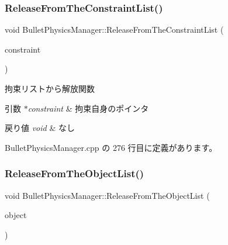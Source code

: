 \mbox{\label{class_bullet_physics_manager_a1984c226e0d77dfdf677070d659664de}} 
\subsubsection{\texorpdfstring{Release\+From\+The\+Constraint\+List()}{ReleaseFromTheConstraintList()}}
{\footnotesize\ttfamily void Bullet\+Physics\+Manager\+::\+Release\+From\+The\+Constraint\+List (\begin{DoxyParamCaption}\item[{\mbox{\hyperlink{class_bullet_physics_constraint}{Bullet\+Physics\+Constraint}} $\ast$}]{constraint }\end{DoxyParamCaption})}



拘束リストから解放関数 


\begin{DoxyParams}{引数}
{\em $\ast$constraint} & 拘束自身のポインタ \\
\hline
\end{DoxyParams}

\begin{DoxyRetVals}{戻り値}
{\em void} & なし \\
\hline
\end{DoxyRetVals}


 Bullet\+Physics\+Manager.\+cpp の 276 行目に定義があります。

\mbox{\label{class_bullet_physics_manager_a33ae1074dd25ea32dcc7e5c402231b11}} 
\subsubsection{\texorpdfstring{Release\+From\+The\+Object\+List()}{ReleaseFromTheObjectList()}}
{\footnotesize\ttfamily void Bullet\+Physics\+Manager\+::\+Release\+From\+The\+Object\+List (\begin{DoxyParamCaption}\item[{\mbox{\hyperlink{class_bullet_physics_object}{Bullet\+Physics\+Object}} $\ast$}]{object }\end{DoxyParamCaption})}



